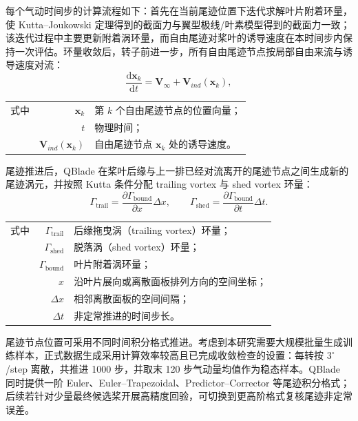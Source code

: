 每个气动时间步的计算流程如下：首先在当前尾迹位置下迭代求解叶片附着环量，使 Kutta--Joukowski 定理得到的截面力与翼型极线/叶素模型得到的截面力一致；该迭代过程中主要更新附着涡环量，而自由尾迹对桨叶的诱导速度在本时间步内保持一次评估。环量收敛后，转子前进一步，所有自由尾迹节点按局部自由来流与诱导速度对流：
\begin{equation}
\frac{\mathrm{d}\mathbf{x}_k}{\mathrm{d}t}
= \mathbf{V}_{\infty}+\mathbf{V}_{ind}(\mathbf{x}_k),
\end{equation}
\noindent
\begin{tabularx}{\textwidth}{@{}l@{\quad}r@{———}X@{}}
式中 & $\mathbf{x}_k$                 & 第 $k$ 个自由尾迹节点的位置向量；\\
     & $t$                            & 物理时间；\\
     & $\mathbf{V}_{ind}(\mathbf{x}_k)$ & 自由尾迹节点 $\mathbf{x}_k$ 处的诱导速度。\\
\end{tabularx}\vspace{3.15bp}

尾迹推进后，QBlade 在桨叶后缘与上一排已经对流离开的尾迹节点之间生成新的尾迹涡元，并按照 Kutta 条件分配 trailing vortex 与 shed vortex 环量：
\begin{equation}
\Gamma_{\mathrm{trail}} = \frac{\partial\Gamma_{\mathrm{bound}}}{\partial x}\Delta x,
\qquad
\Gamma_{\mathrm{shed}} = \frac{\partial\Gamma_{\mathrm{bound}}}{\partial t}\Delta t .
\label{eq:trail_shed_gamma}
\end{equation}
\noindent
\begin{tabularx}{\textwidth}{@{}l@{\quad}r@{———}X@{}}
式中 & $\Gamma_{\mathrm{trail}}$ & 后缘拖曳涡（trailing vortex）环量；\\
     & $\Gamma_{\mathrm{shed}}$  & 脱落涡（shed vortex）环量；\\
     & $\Gamma_{\mathrm{bound}}$ & 叶片附着涡环量；\\
     & $x$                      & 沿叶片展向或离散面板排列方向的空间坐标；\\
     & $\Delta x$               & 相邻离散面板的空间间隔；\\
     & $\Delta t$               & 非定常推进的时间步长。\\
\end{tabularx}\vspace{3.15bp}

尾迹节点位置可采用不同时间积分格式推进。考虑到本研究需要大规模批量生成训练样本，正式数据生成采用计算效率较高且已完成收敛检查的设置：每转按 $3^\circ$/step 离散，共推进 1000 步，并取末 120 步气动量均值作为稳态样本。QBlade 同时提供一阶 Euler、Euler--Trapezoidal、Predictor--Corrector 等尾迹积分格式；后续若针对少量最终候选桨开展高精度回验，可切换到更高阶格式复核尾迹非定常误差。

